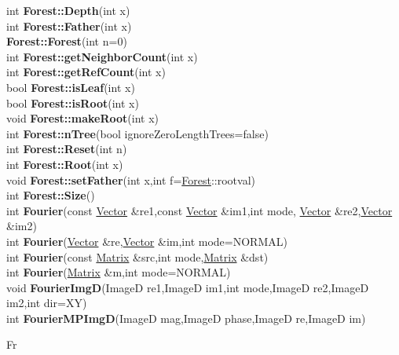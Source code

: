 \documentclass[10pt,titlepage]{article}
\def\functionlistentry#1#2#3#4#5#6{\noindent #1 {\bf #2}(#3) \dotfill #6\\}
\def\letterref#1{}
\def\letterlabel#1{\vspace{0.5cm}\centerline{\Large #1}}
\def\letterlabelend#1{}
\begin{document}
{{\letterref{Fe}
\letterref{Fi}
\letterref{Fm}
\letterref{Fo}
\letterref{Fr}
\letterref{Fu}
\letterlabelend{Fo}
\functionlistentry{int}{Forest::Depth}{int x}{1288}{graph}{}
\functionlistentry{int}{Forest::Father}{int x}{1286}{graph}{}
\functionlistentry{}{Forest::Forest}{int n=0}{1276}{graph}{}
\functionlistentry{int}{Forest::getNeighborCount}{int x}{1281}{graph}{}
\functionlistentry{int}{Forest::getRefCount}{int x}{1280}{graph}{}
\functionlistentry{bool}{Forest::isLeaf}{int x}{1284}{graph}{}
\functionlistentry{bool}{Forest::isRoot}{int x}{1283}{graph}{}
\functionlistentry{void}{Forest::makeRoot}{int x}{1285}{graph}{}
\functionlistentry{int}{Forest::nTree}{bool ignoreZeroLengthTrees=false}{1279}{graph}{}
\functionlistentry{int}{Forest::Reset}{int n}{1277}{graph}{}
\functionlistentry{int}{Forest::Root}{int x}{1287}{graph}{}
\functionlistentry{void}{Forest::setFather}{int x,int f=\hyperlink{Forest}{Forest}::rootval}{1282}{graph}{}
\functionlistentry{int}{Forest::Size}{}{1278}{graph}{}
\functionlistentry{int}{Fourier}{const \hyperlink{Vector}{Vector} \&re1,const \hyperlink{Vector}{Vector} \&im1,int mode, \hyperlink{Vector}{Vector} \&re2,\hyperlink{Vector}{Vector} \&im2}{1194}{signalTrafo}{}
\functionlistentry{int}{Fourier}{\hyperlink{Vector}{Vector} \&re,\hyperlink{Vector}{Vector} \&im,int mode=NORMAL}{1195}{signalTrafo}{}
\functionlistentry{int}{Fourier}{const \hyperlink{Matrix}{Matrix} \&src,int mode,\hyperlink{Matrix}{Matrix} \&dst}{1196}{signalTrafo}{}
\functionlistentry{int}{Fourier}{\hyperlink{Matrix}{Matrix} \&m,int mode=NORMAL}{1197}{signalTrafo}{}
\functionlistentry{void}{FourierImgD}{ImageD re1,ImageD im1,int mode,ImageD re2,ImageD im2,int dir=XY}{1200}{signalTrafo}{}
\functionlistentry{int}{FourierMPImgD}{ImageD mag,ImageD phase,ImageD re,ImageD im}{1208}{signalTrafo}{}

\letterlabel{Fr}
\letterref{A}
\letterref{B}
\letterref{C}
\letterref{D}
\letterref{E}
\letterref{F}
\letterref{G}
\letterref{H}
\letterref{I}
\letterref{K}
\letterref{L}
\letterref{M}
\letterref{N}
\letterref{O}
\letterref{P}
\letterref{Q}
\letterref{R}
\letterref{S}
\letterref{T}
\letterref{U}
\letterref{V}
\letterref{W}
\letterref{X}
\letterref{Y}
\letterref{Z}

}}
\end{document}

